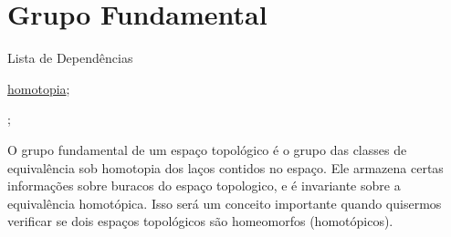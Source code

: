 \section{Grupo Fundamental}
\label{grupo-fundamental}

\begin{titlemize}{Lista de Dependências}
	\item \hyperref[Homotopia]{homotopia};\\ %
	\item \hyperref[]{};
\end{titlemize}

O grupo fundamental de um espaço topológico é o grupo das classes de equivalência sob homotopia dos laços contidos no espaço. Ele armazena certas informações sobre buracos do espaço topologico, e é invariante sobre a equivalência homotópica. Isso será um conceito importante quando quisermos verificar se dois espaços topológicos são homeomorfos (homotópicos).





